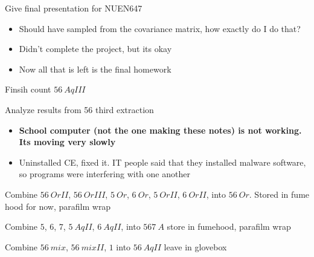 \documentclass[idxtotoc,hyperref,openany,oneside]{labbook} %
\newcommand{\cmark}{\ding{51}}%
\newcommand{\done}{\rlap{$\square$}{\raisebox{2pt}{\large\hspace{1pt}\cmark}}%
  \hspace{-2.5pt}}
\begin{document}

\begin{todolist}
\item[\done]{Give final presentation for NUEN647}
  \begin{itemize}
  \item{Should have sampled from the covariance matrix,
  how exactly do I do that?}
  \item{Didn't complete the project, but its okay}
  \item{Now all that is left is the final homework}
  \end{itemize}
\end{todolist}


\begin{todolist}
\item[\done]{Finsih count $\boxed{56\ AqIII}$}
\item[\done]{Analyze results from 56 third extraction}
  \begin{itemize}
  \item{\textbf{School computer (not the one making these notes)
      is not working. Its moving very slowly}}
  \item{Uninstalled CE, fixed it. IT people said that they
    installed malware software, so programs were interfering
    with one another}
  \end{itemize}
\item[\done]{Combine $\boxed{56\ OrII}$,
  $\boxed{56\ OrIII}$, $\boxed{5\ Or}$, $\boxed{6\ Or}$,
  $\boxed{5\ OrII}$, $\boxed{6\ OrII}$, into $\boxed{56\ Or}$.
  Stored in fume hood for now, parafilm wrap}
\item[\done]{Combine $\boxed{5}$, $\boxed{6}$, $\boxed{7}$,
  $\boxed{5\ AqII}$, $\boxed{6\ AqII}$,
  into $\boxed{567\ A}$ store in fumehood, parafilm wrap}
\item[\done]{Combine $\boxed{56\ mix}$, $\boxed{56\ mixII}$,
  $\boxed{1}$ into $\boxed{56\ Aq II}$ leave in glovebox}
\end{todolist}


\end{document}

